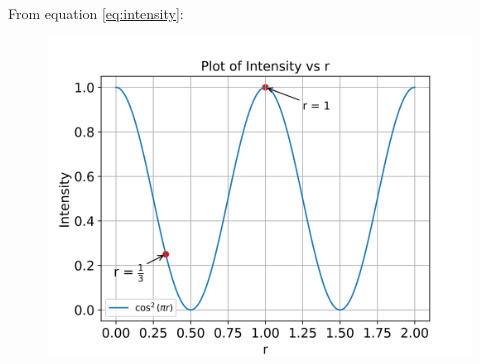 \documentclass[journal,12pt,twocolumn]{IEEEtran}
\theoremstyle{remark}
\begin{document}
From equation \eqref{eq:intensity}:
\begin{figure}[htbp]
    \centering
    \includegraphics[width = \columnwidth]{ncert-physics/12/10/5/figs/intensity_plot.png}
  \caption{}
    \label{fig:graph1}
\end{figure}

\end{document}
